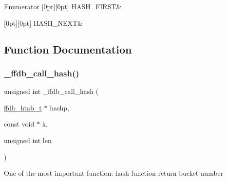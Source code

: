 \begin{DoxyEnumFields}{Enumerator}
[0pt][0pt]{}\mbox{\label{adat-devel_2other__libs_2filedb_2filehash_2ffdb__hash_8h_ae3a6b7e1199f276d75597e986e42c1a3adc0af88b177ed84b880af77d798817c9}} 
H\+A\+S\+H\+\_\+\+F\+I\+R\+ST&\\
\hline

[0pt][0pt]{}\mbox{\label{adat-devel_2other__libs_2filedb_2filehash_2ffdb__hash_8h_ae3a6b7e1199f276d75597e986e42c1a3ac256bf8f18e731a39301227dd4ca10c0}} 
H\+A\+S\+H\+\_\+\+N\+E\+XT&\\
\hline

\end{DoxyEnumFields}


\subsection{Function Documentation}
\mbox{\label{adat-devel_2other__libs_2filedb_2filehash_2ffdb__hash_8h_a2f4a425a3740bb0320ef61b8c9fdcef1}} 
\subsubsection{\texorpdfstring{\_ffdb\_call\_hash()}{\_ffdb\_call\_hash()}}
{\footnotesize\ttfamily unsigned int \+\_\+ffdb\+\_\+call\+\_\+hash (\begin{DoxyParamCaption}\item[{\mbox{\hyperlink{adat-devel_2other__libs_2filedb_2filehash_2ffdb__hash_8h_ae592010ed2bedc975d3cc0b7d074b9d1}{ffdb\+\_\+htab\+\_\+t}} $\ast$}]{hashp,  }\item[{const void $\ast$}]{k,  }\item[{unsigned int}]{len }\end{DoxyParamCaption})}

One of the most important function\+: hash function return bucket number \mbox{\label{adat-devel_2other__libs_2filedb_2filehash_2ffdb__hash_8h_a4c01318294eb0c4c8414f1a48a4e2ca4}} 
